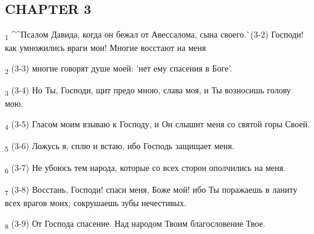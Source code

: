 \subsection{CHAPTER 3}
\begin{tcolorbox}
\textsubscript{1} ^^Псалом Давида, когда он бежал от Авессалома, сына своего.^^ (3-2) Господи! как умножились враги мои! Многие восстают на меня
\end{tcolorbox}
\begin{tcolorbox}
\textsubscript{2} (3-3) многие говорят душе моей: 'нет ему спасения в Боге'.
\end{tcolorbox}
\begin{tcolorbox}
\textsubscript{3} (3-4) Но Ты, Господи, щит предо мною, слава моя, и Ты возносишь голову мою.
\end{tcolorbox}
\begin{tcolorbox}
\textsubscript{4} (3-5) Гласом моим взываю к Господу, и Он слышит меня со святой горы Своей.
\end{tcolorbox}
\begin{tcolorbox}
\textsubscript{5} (3-6) Ложусь я, сплю и встаю, ибо Господь защищает меня.
\end{tcolorbox}
\begin{tcolorbox}
\textsubscript{6} (3-7) Не убоюсь тем народа, которые со всех сторон ополчились на меня.
\end{tcolorbox}
\begin{tcolorbox}
\textsubscript{7} (3-8) Восстань, Господи! спаси меня, Боже мой! ибо Ты поражаешь в ланиту всех врагов моих; сокрушаешь зубы нечестивых.
\end{tcolorbox}
\begin{tcolorbox}
\textsubscript{8} (3-9) От Господа спасение. Над народом Твоим благословение Твое.
\end{tcolorbox}
